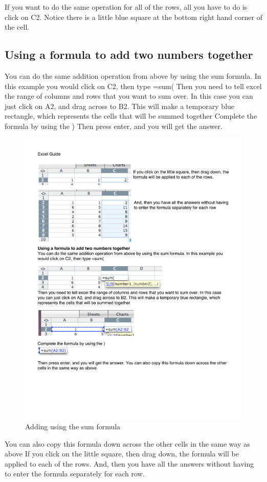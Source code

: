 If you want to do the same operation for all of the rows, all you have to do is click on C2. Notice there is a little blue square at the bottom right hand corner of the cell.
   

\subsection{Using a formula to add two numbers together}
You can do the same addition operation from above by using the sum formula. In this example you would click on C2, then type =sum(
Then you need to tell excel the range of columns and rows that you want to sum over. In this case you can just click on A2, and drag across to B2. This will make a temporary blue rectangle, which represents the cells that will be summed together
Complete the formula by using the )
Then press enter, and you will get the answer. 

\begin{figure}
      \includegraphics[width=.5\linewidth]{LabmanualFigures/Excel6.pdf}
      \caption{Adding using the sum formula}
      \label{fig:excel6}
\end{figure}

You can also copy this formula down across the other cells in the same way as above
If you click on the little square, then drag down, the formula will be applied to each of the rows.
And, then you have all the answers without having to enter the formula separately for each row.

